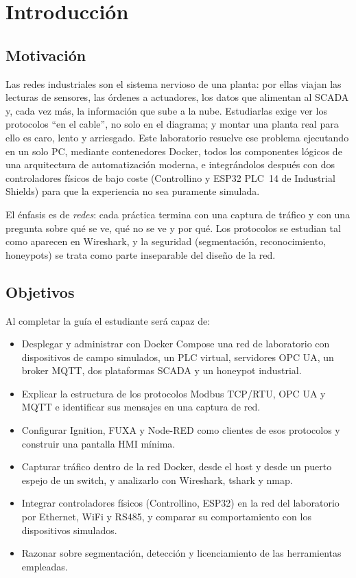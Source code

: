 \chapter{Introducción}
\label{cap:intro}

\section{Motivación}

Las redes industriales son el sistema nervioso de una planta: por ellas viajan las lecturas de sensores, las órdenes a actuadores, los datos que alimentan al SCADA y, cada vez más, la información que sube a la nube. Estudiarlas exige ver los protocolos ``en el cable'', no solo en el diagrama; y montar una planta real para ello es caro, lento y arriesgado. Este laboratorio resuelve ese problema ejecutando en un solo PC, mediante contenedores Docker, todos los componentes lógicos de una arquitectura de automatización moderna, e integrándolos después con dos controladores físicos de bajo coste (Controllino y ESP32 PLC~14 de Industrial Shields) para que la experiencia no sea puramente simulada.

El énfasis es de \emph{redes}: cada práctica termina con una captura de tráfico y con una pregunta sobre qué se ve, qué no se ve y por qué. Los protocolos se estudian tal como aparecen en Wireshark, y la seguridad (segmentación, reconocimiento, honeypots) se trata como parte inseparable del diseño de la red.

\section{Objetivos}

Al completar la guía el estudiante será capaz de:
\begin{itemize}
  \item Desplegar y administrar con Docker Compose una red de laboratorio con dispositivos de campo simulados, un PLC virtual, servidores OPC UA, un broker MQTT, dos plataformas SCADA y un honeypot industrial.
  \item Explicar la estructura de los protocolos Modbus TCP/RTU, OPC UA y MQTT e identificar sus mensajes en una captura de red.
  \item Configurar Ignition, FUXA y Node-RED como clientes de esos protocolos y construir una pantalla HMI mínima.
  \item Capturar tráfico dentro de la red Docker, desde el host y desde un puerto espejo de un switch, y analizarlo con Wireshark, tshark y nmap.
  \item Integrar controladores físicos (Controllino, ESP32) en la red del laboratorio por Ethernet, WiFi y RS485, y comparar su comportamiento con los dispositivos simulados.
  \item Razonar sobre segmentación, detección y licenciamiento de las herramientas empleadas.
\end{itemize}


